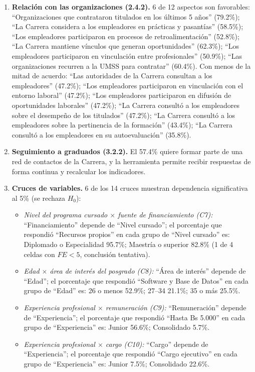 \begin{enumerate}
  \item \textbf{Relación con las organizaciones (2.4.2).} 6 de 12 aspectos son favorables: ``Organizaciones que contrataron titulados en los últimos 5 años'' (79.2\%); ``La Carrera considera a los empleadores en prácticas y pasantías'' (58.5\%); ``Los empleadores participaron en procesos de retroalimentación'' (52.8\%); ``La Carrera mantiene vínculos que generan oportunidades'' (62.3\%); ``Los empleadores participaron en vinculación entre profesionales'' (50.9\%); ``Las organizaciones recurren a la UMSS para contratar'' (60.4\%). Con menos de la mitad de acuerdo: ``Las autoridades de la Carrera consultan a los empleadores'' (47.2\%); ``Los empleadores participaron en vinculación con el entorno laboral'' (47.2\%); ``Los empleadores participaron en difusión de oportunidades laborales'' (47.2\%); ``La Carrera consultó a los empleadores sobre el desempeño de los titulados'' (47.2\%); ``La Carrera consultó a los empleadores sobre la pertinencia de la formación'' (43.4\%); ``La Carrera consultó a los empleadores en su autoevaluación'' (35.8\%).
  \item \textbf{Seguimiento a graduados (3.2.2).} El 57.4\% quiere formar parte de una red de contactos de la Carrera, y la herramienta permite recibir respuestas de forma continua y recalcular los indicadores.
  \item \textbf{Cruces de variables.} 6 de los 14 cruces muestran dependencia significativa al 5\% (se rechaza $H_0$):
  \begin{itemize}[nosep]
    \item \emph{Nivel del programa cursado $\times$ fuente de financiamiento (C7):} ``Financiamiento'' depende de ``Nivel cursado''; el porcentaje que respondió ``Recursos propios'' en cada grupo de ``Nivel cursado'' es: Diplomado o Especialidad 95.7\%; Maestría o superior 82.8\% (1 de 4 celdas con $FE<5$, conclusión tentativa).
    \item \emph{Edad $\times$ área de interés del posgrado (C8):} ``Área de interés'' depende de ``Edad''; el porcentaje que respondió ``Software y Base de Datos'' en cada grupo de ``Edad'' es: 26 o menos 52.9\%; 27–34 21.1\%; 35 o más 25.5\%.
    \item \emph{Experiencia profesional $\times$ remuneración (C9):} ``Remuneración'' depende de ``Experiencia''; el porcentaje que respondió ``Hasta Bs 5.000'' en cada grupo de ``Experiencia'' es: Junior 56.6\%; Consolidado 5.7\%.
    \item \emph{Experiencia profesional $\times$ cargo (C10):} ``Cargo'' depende de ``Experiencia''; el porcentaje que respondió ``Cargo ejecutivo'' en cada grupo de ``Experiencia'' es: Junior 7.5\%; Consolidado 22.6\%.

\end{itemize}
\end{enumerate}
